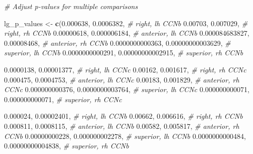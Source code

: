 \documentclass[
]{article}
\newenvironment{Shaded}{\begin{snugshade}}{\end{snugshade}}
\newcommand{\CommentTok}[1]{\textcolor[rgb]{0.56,0.35,0.01}{\textit{#1}}}
\newcommand{\FloatTok}[1]{\textcolor[rgb]{0.00,0.00,0.81}{#1}}
\newcommand{\KeywordTok}[1]{\textcolor[rgb]{0.13,0.29,0.53}{\textbf{#1}}}
\newcommand{\NormalTok}[1]{#1}
\newcommand{\StringTok}[1]{\textcolor[rgb]{0.31,0.60,0.02}{#1}}
\begin{document}
\begin{Shaded}
\begin{Highlighting}[]
\CommentTok{# Adjust p-values for multiple comparisons}

\NormalTok{lg_p_values <-}\StringTok{ }\KeywordTok{c}\NormalTok{(}\FloatTok{0.000638}\NormalTok{, }\FloatTok{0.0006382}\NormalTok{, }\CommentTok{# right, lh CCNb}
                 \FloatTok{0.00703}\NormalTok{, }\FloatTok{0.007029}\NormalTok{, }\CommentTok{# right, rh CCNb}
                 \FloatTok{0.00000618}\NormalTok{, }\FloatTok{0.000006184}\NormalTok{, }\CommentTok{# anterior, lh CCNb}
                 \FloatTok{0.000084683827}\NormalTok{, }\FloatTok{0.00008468}\NormalTok{, }\CommentTok{# anterior, rh CCNb}
                 \FloatTok{0.0000000000363}\NormalTok{, }\FloatTok{0.00000000003629}\NormalTok{, }\CommentTok{# superior, lh CCNb}
                 \FloatTok{0.0000000000291}\NormalTok{, }\FloatTok{0.00000000002915}\NormalTok{, }\CommentTok{# superior, rh CCNb}
                 
                 \FloatTok{0.0000138}\NormalTok{, }\FloatTok{0.00001377}\NormalTok{, }\CommentTok{# right, lh CCNc}
                 \FloatTok{0.00162}\NormalTok{, }\FloatTok{0.001617}\NormalTok{, }\CommentTok{# right, rh CCNc}
                 \FloatTok{0.000475}\NormalTok{, }\FloatTok{0.0004753}\NormalTok{, }\CommentTok{# anterior, lh CCNc}
                 \FloatTok{0.00183}\NormalTok{, }\FloatTok{0.001829}\NormalTok{, }\CommentTok{# anterior, rh CCNc}
                 \FloatTok{0.000000000376}\NormalTok{, }\FloatTok{0.0000000003764}\NormalTok{, }\CommentTok{# superior, lh CCNc}
                 \FloatTok{0.000000000071}\NormalTok{, }\FloatTok{0.000000000071}\NormalTok{, }\CommentTok{# superior, rh CCNc}
                 
              
                 \FloatTok{0.000024}\NormalTok{, }\FloatTok{0.00002401}\NormalTok{, }\CommentTok{# right, lh CCNb}
                 \FloatTok{0.00662}\NormalTok{, }\FloatTok{0.006616}\NormalTok{, }\CommentTok{# right, rh CCNb}
                 \FloatTok{0.000811}\NormalTok{, }\FloatTok{0.0008115}\NormalTok{, }\CommentTok{# anterior, lh CCNb}
                 \FloatTok{0.00582}\NormalTok{, }\FloatTok{0.005817}\NormalTok{, }\CommentTok{# anterior, rh CCNb}
                 \FloatTok{0.00000000228}\NormalTok{, }\FloatTok{0.000000002278}\NormalTok{, }\CommentTok{# superior, lh CCNb}
                 \FloatTok{0.0000000000484}\NormalTok{, }\FloatTok{0.00000000004838}\NormalTok{, }\CommentTok{# superior, rh CCNb}
                 

\end{Highlighting}
\end{Shaded}
\end{document}
